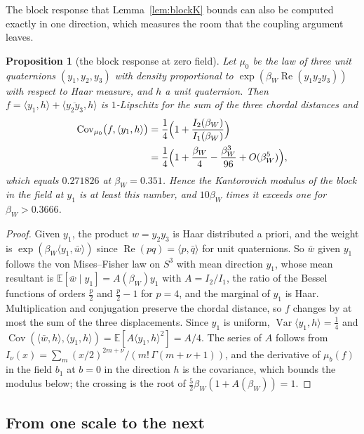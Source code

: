 \documentclass[11pt]{amsart}
\newtheorem{proposition}[theorem]{Proposition}
\theoremstyle{definition}
\theoremstyle{remark}
\numberwithin{equation}{section}
\newcommand{\E}{\mathbb{E}}
\newcommand{\Cov}{\operatorname{Cov}}
\newcommand{\Var}{\operatorname{Var}}
\newcommand{\ip}[2]{\langle #1,#2\rangle}
\begin{document}
The block response that Lemma~\ref{lem:blockK} bounds can also be
computed exactly in one direction, which measures the room that the
coupling argument leaves.

\begin{proposition}[the block response at zero field]\label{prop:blockresponse}
Let $\mu_0$ be the law of three unit quaternions $(y_1,y_2,y_3)$ with
density proportional to $\exp(\beta_W\operatorname{Re}(y_1y_2y_3))$ with
respect to Haar measure, and $h$ a unit quaternion. Then $f=\ip{y_1}h+
\ip{\overline{y_2y_3}}h$ is $1$-Lipschitz for the sum of the three chordal
distances and
\[
\begin{split}
\Cov_{\mu_0}\bigl(f,\ip{y_1}h\bigr)&=\frac14\Bigl(1+\frac{I_2(\beta_W)}
{I_1(\beta_W)}\Bigr)\\
&=\frac14\Bigl(1+\frac{\beta_W}4-\frac{\beta_W^3}{96}+O(\beta_W^5)\Bigr),
\end{split}
\]
which equals $0.271826$ at $\beta_W=0.351$. Hence the Kantorovich
modulus of the block in the field at $y_1$ is at least this number, and
$10\beta_W$ times it exceeds one for $\beta_W>0.3666$.
\end{proposition}

\begin{proof}
Given $y_1$, the product $w=y_2y_3$ is Haar distributed a priori, and the
weight is $\exp(\beta_W\ip{y_1}{\bar w})$ since $\operatorname{Re}(pq)=
\ip p{\bar q}$ for unit quaternions. So $\bar w$ given $y_1$ follows the
von Mises--Fisher law on $S^3$ with mean direction $y_1$, whose mean
resultant is $\E[\bar w\mid y_1]=A(\beta_W)y_1$ with $A=I_2/I_1$, the ratio
of the Bessel functions of orders $\frac p2$ and $\frac p2-1$ for $p=4$,
and the marginal of $y_1$ is Haar. Multiplication and conjugation preserve
the chordal distance, so $f$ changes by at most the sum of the three
displacements. Since $y_1$ is uniform, $\Var\ip{y_1}h=\frac14$ and
$\Cov(\ip{\bar w}h,\ip{y_1}h)=\E[A\ip{y_1}h^2]=A/4$. The series of $A$
follows from $I_\nu(x)=\sum_m(x/2)^{2m+\nu}/(m!\,\Gamma(m+\nu+1))$, and
the derivative of $\mu_b(f)$ in the field $b_1$ at $b=0$ in the direction
$h$ is the covariance, which bounds the modulus below; the crossing is
the root of $\frac52\beta_W(1+A(\beta_W))=1$.
\end{proof}

\subsection{From one scale to the next}\label{ssec:scalestep}
\end{document}
